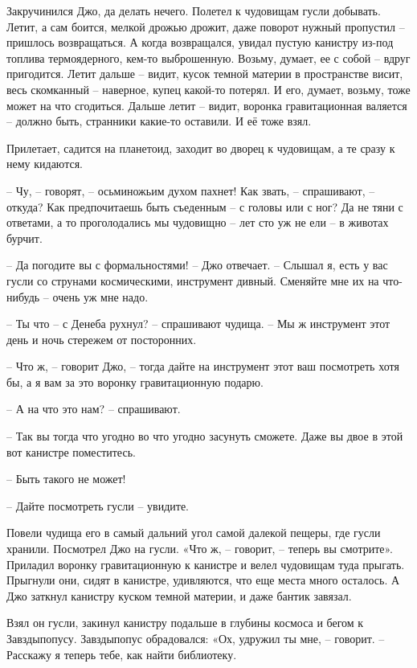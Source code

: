 \documentclass[ebook,oneside,final,openright]{memoir}
\begin{document}
\par
Закручинился Джо, да делать нечего. Полетел к чудовищам гусли добывать. Летит, а сам боится, мелкой дрожью дрожит, даже поворот нужный пропустил – пришлось возвращаться. А когда возвращался, увидал пустую канистру из-под топлива термоядерного, кем-то выброшенную. Возьму, думает, ее с собой – вдруг пригодится. Летит дальше – видит, кусок темной материи в пространстве висит, весь скомканный – наверное, купец какой-то потерял. И его, думает, возьму, тоже может на что сгодиться. Дальше летит – видит, воронка гравитационная валяется – должно быть, странники какие-то оставили. И её тоже взял.\par
\par
Прилетает, садится на планетоид, заходит во дворец к чудовищам, а те сразу к нему кидаются. \par
– Чу, – говорят, – осьминожьим духом пахнет! Как звать, – спрашивают, – откуда? Как предпочитаешь быть съеденным – с головы или с ног? Да не тяни с ответами, а то проголодались мы чудовищно – лет сто уж не ели – в животах бурчит.\par
– Да погодите вы с формальностями! – Джо отвечает. – Слышал я, есть у вас гусли со струнами космическими, инструмент дивный. Сменяйте мне их на что-нибудь – очень уж мне надо.\par
– Ты что – с Денеба рухнул? – спрашивают чудища. – Мы ж инструмент этот день и ночь стережем от посторонних.\par
– Что ж, – говорит Джо, – тогда дайте на инструмент этот ваш посмотреть хотя бы, а я вам за это воронку гравитационную подарю.\par
– А на что это нам? – спрашивают.\par
– Так вы тогда что угодно во что угодно засунуть сможете. Даже вы двое в этой вот канистре поместитесь. \par
– Быть такого не может!\par
– Дайте посмотреть гусли – увидите.\par
\par
Повели чудища его в самый дальний угол самой далекой пещеры, где гусли хранили. Посмотрел Джо на гусли. «Что ж, – говорит, – теперь вы смотрите». Приладил воронку гравитационную к канистре и велел чудовищам туда прыгать. Прыгнули они, сидят в канистре, удивляются, что еще места много осталось. А Джо заткнул канистру куском темной материи, и даже бантик завязал.\par
\par
Взял он гусли, закинул канистру подальше в глубины космоса и бегом к Завздыпопусу. Завздыпопус обрадовался: «Ох, удружил ты мне, – говорит. – Расскажу я теперь тебе, как найти библиотеку.\par
\end{document}
